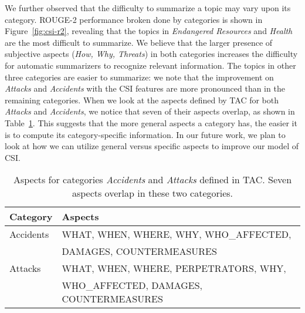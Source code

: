 We further observed that the difficulty to summarize a topic may vary upon its category.  ROUGE-2 performance broken done by categories is shown in Figure~\ref{fig:csi-r2}, revealing that the topics in \emph{Endangered Resources} and \emph{Health} are the most difficult to summarize. 
We believe that the larger presence of subjective aspects (\textit{How, Why, Threats}) in both categories increases the difficulty for automatic summarizers to recognize relevant information.
The topics in other three categories are easier to summarize: we note that the improvement on \emph{Attacks} and \emph{Accidents} with the CSI features are more pronounced than in the remaining categories.  When we look at the aspects defined by TAC for both \emph{Attacks} and \emph{Accidents}, we notice that seven of their aspects overlap, as shown in Table~\ref{table:2_aspects}.  This suggests that the more general aspects a category has, the easier it is to compute its category-specific information.
In our future work, we plan to look at how we can utilize general versus specific aspects to improve our model of CSI.


\begin{table}[h]
\centering
\begin{center}
\begin{tabular}{l||l}
\textbf{Category} & \textbf{Aspects}  \\ \hline
        Accidents & WHAT, WHEN, WHERE, WHY, WHO\_AFFECTED, \\
                  & DAMAGES, COUNTERMEASURES \\
          Attacks & WHAT, WHEN, WHERE, PERPETRATORS, WHY, \\
                  & WHO\_AFFECTED, DAMAGES, COUNTERMEASURES \\
\end{tabular}
\end{center}
\caption{Aspects for categories \emph{Accidents} and \emph{Attacks} defined in TAC. Seven aspects overlap in these two categories.}
\label{table:2_aspects}
\end{table}

